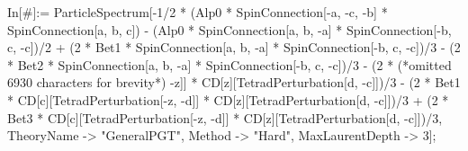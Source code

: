 In[#]:= ParticleSpectrum[-1/2 * (Alp0 * SpinConnection[-a, -c, -b] * SpinConnection[a, b, c]) - (Alp0 * SpinConnection[a, b, -a] * SpinConnection[-b, c, -c])/2 + (2 * Bet1 * SpinConnection[a, b, -a] * SpinConnection[-b, c, -c])/3 - (2 * Bet2 * SpinConnection[a, b, -a] * SpinConnection[-b, c, -c])/3 - (2 * (*omitted 6930 characters for brevity*) -z]] * CD[z][TetradPerturbation[d, -c]])/3 - (2 * Bet1 * CD[c][TetradPerturbation[-z, -d]] * CD[z][TetradPerturbation[d, -c]])/3 + (2 * Bet3 * CD[c][TetradPerturbation[-z, -d]] * CD[z][TetradPerturbation[d, -c]])/3, TheoryName -> "GeneralPGT", Method -> "Hard", MaxLaurentDepth -> 3];